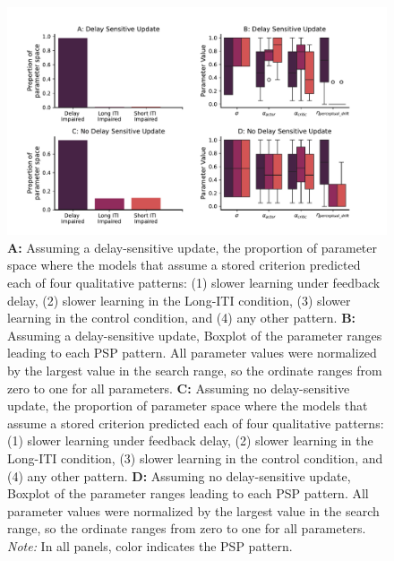 \documentclass[doc, floatsintext]{apa7}
\begin{document}
\begin{figure} 
  \centering
  \includegraphics[width=1\textwidth]{../figures/model_new_class_I.pdf}
  \caption{ 
      \textbf{A:} Assuming a delay-sensitive update, the
      proportion of parameter space where the models that
      assume a stored criterion predicted each of four
      qualitative patterns: (1) slower learning under
      feedback delay, (2) slower learning in the Long-ITI
      condition, (3) slower learning in the control
      condition, and (4) any other pattern. 
      \textbf{B:} Assuming a delay-sensitive update, Boxplot
      of the parameter ranges leading to each PSP pattern.
      All parameter values were normalized by the largest
      value in the search range, so the ordinate ranges from
      zero to one for all parameters.
      \textbf{C:} Assuming no delay-sensitive update, the
      proportion of parameter space where the models that
      assume a stored criterion predicted each of four
      qualitative patterns: (1) slower learning under
      feedback delay, (2) slower learning in the Long-ITI
      condition, (3) slower learning in the control
      condition, and (4) any other pattern. 
      \textbf{D:} Assuming no delay-sensitive update, Boxplot
      of the parameter ranges leading to each PSP pattern.
      All parameter values were normalized by the largest
      value in the search range, so the ordinate ranges from
      zero to one for all parameters.
      \textit{Note:} In all panels, color indicates the PSP
      pattern.
}
  \label{fig:model_class_I_results}
\end{figure}
\end{document}
